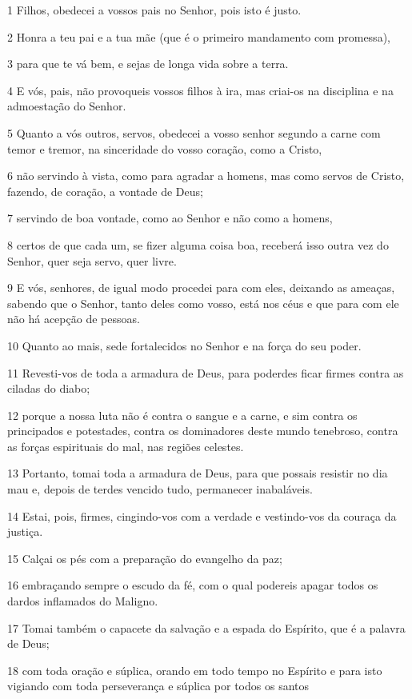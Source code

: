 \par 1 Filhos, obedecei a vossos pais no Senhor, pois isto é justo.
\par 2 Honra a teu pai e a tua mãe (que é o primeiro mandamento com promessa),
\par 3 para que te vá bem, e sejas de longa vida sobre a terra.
\par 4 E vós, pais, não provoqueis vossos filhos à ira, mas criai-os na disciplina e na admoestação do Senhor.
\par 5 Quanto a vós outros, servos, obedecei a vosso senhor segundo a carne com temor e tremor, na sinceridade do vosso coração, como a Cristo,
\par 6 não servindo à vista, como para agradar a homens, mas como servos de Cristo, fazendo, de coração, a vontade de Deus;
\par 7 servindo de boa vontade, como ao Senhor e não como a homens,
\par 8 certos de que cada um, se fizer alguma coisa boa, receberá isso outra vez do Senhor, quer seja servo, quer livre.
\par 9 E vós, senhores, de igual modo procedei para com eles, deixando as ameaças, sabendo que o Senhor, tanto deles como vosso, está nos céus e que para com ele não há acepção de pessoas.
\par 10 Quanto ao mais, sede fortalecidos no Senhor e na força do seu poder.
\par 11 Revesti-vos de toda a armadura de Deus, para poderdes ficar firmes contra as ciladas do diabo;
\par 12 porque a nossa luta não é contra o sangue e a carne, e sim contra os principados e potestades, contra os dominadores deste mundo tenebroso, contra as forças espirituais do mal, nas regiões celestes.
\par 13 Portanto, tomai toda a armadura de Deus, para que possais resistir no dia mau e, depois de terdes vencido tudo, permanecer inabaláveis.
\par 14 Estai, pois, firmes, cingindo-vos com a verdade e vestindo-vos da couraça da justiça.
\par 15 Calçai os pés com a preparação do evangelho da paz;
\par 16 embraçando sempre o escudo da fé, com o qual podereis apagar todos os dardos inflamados do Maligno.
\par 17 Tomai também o capacete da salvação e a espada do Espírito, que é a palavra de Deus;
\par 18 com toda oração e súplica, orando em todo tempo no Espírito e para isto vigiando com toda perseverança e súplica por todos os santos
